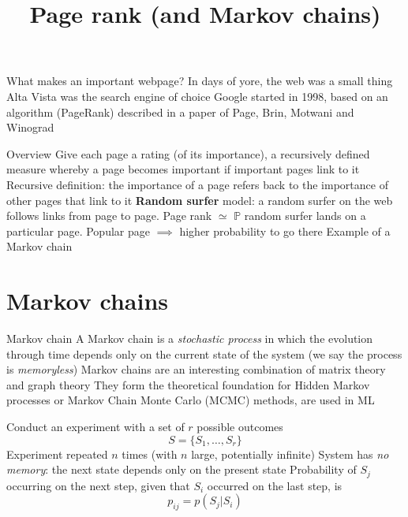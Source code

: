 \documentclass[aspectratio=43]{beamer}
\title{Page rank (and Markov chains)}
\date{}
\begin{document}
\begin{frame}
	\titlepage
\end{frame}


\begin{frame}{What makes an important webpage?}
	In days of yore, the web was a small thing
	\vfill
	Alta Vista was the search engine of choice
	\vfill
	Google started in 1998, based on an algorithm (PageRank) described in a paper of Page, Brin, Motwani and Winograd
\end{frame}

\begin{frame}{Overview}
	Give each page a rating (of its importance), a recursively defined measure whereby a page becomes important if important pages link to it
	\vfill
	Recursive definition: the importance of a page refers back to the importance of other pages that link to it
	\vfill
	\textbf{Random surfer} model: a random surfer on the web follows links from page to page. Page rank $\simeq$ $\mathbb{P}$ random surfer lands on a particular page. Popular page $\implies$ higher probability to go there
	\vfill Example of a Markov chain
\end{frame}

\section{Markov chains}
\begin{frame}{Markov chain}
	A Markov chain is a \emph{stochastic process} in which the evolution through time depends only on the current state of the system (we say the process is \emph{memoryless})
	\vfill
	Markov chains are an interesting combination of matrix theory and graph theory
	\vfill
	They form the theoretical foundation for Hidden Markov processes or Markov Chain Monte Carlo (MCMC) methods, are used in ML
\end{frame}



\begin{frame}
Conduct an experiment with a set of $r$ possible outcomes
\[
S=\{S_1,\dots, S_r\}
\]
\vfill
Experiment repeated $n$ times (with $n$ large, potentially infinite)
\vfill 
System has \emph{no memory}: the next state depends only on the present state
\vfill
Probability of $S_j$ occurring on the next step, given that $S_i$ occurred on the last step, is
\[
p_{ij}=p(S_j|S_i)
\]
\end{frame}
\end{document}
